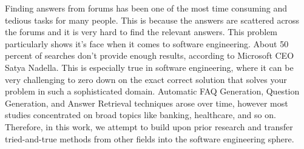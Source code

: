 
Finding answers from forums has been one of the most time consuming and tedious tasks for many people. This is because the answers are scattered across the forums and it is very hard to find the relevant answers. This problem particularly shows it's face when it comes to software engineering. About 50 percent of searches don't provide enough results, according to Microsoft CEO Satya Nadella. This is especially true in software engineering, where it can be very challenging to zero down on the exact correct solution that solves your problem in such a sophisticated domain. Automatic FAQ Generation, Question Generation, and Answer Retrieval techniques arose over time, however most studies concentrated on broad topics like banking, healthcare, and so on. Therefore, in this work, we attempt to build upon prior research and transfer tried-and-true methods from other fields into the software engineering sphere.